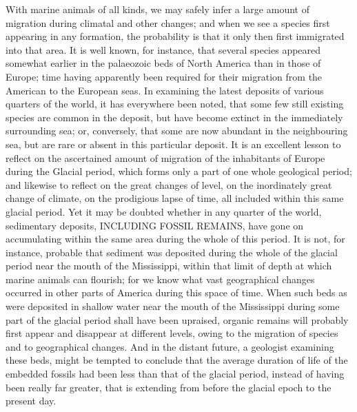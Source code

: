 With marine animals of all kinds, we may safely infer a large amount of migration during climatal and other changes; and when we see a species first appearing in any formation, the probability is that it only then first immigrated into that area. It is well known, for instance, that several species appeared somewhat earlier in the palaeozoic beds of North America than in those of Europe; time having apparently been required for their migration from the American to the European seas. In examining the latest deposits of various quarters of the world, it has everywhere been noted, that some few still existing species are common in the deposit, but have become extinct in the immediately surrounding sea; or, conversely, that some are now abundant in the neighbouring sea, but are rare or absent in this particular deposit. It is an excellent lesson to reflect on the ascertained amount of migration of the inhabitants of Europe during the Glacial period, which forms only a part of one whole geological period; and likewise to reflect on the great changes of level, on the inordinately great change of climate, on the prodigious lapse of time, all included within this same glacial period. Yet it may be doubted whether in any quarter of the world, sedimentary deposits, INCLUDING FOSSIL REMAINS, have gone on accumulating within the same area during the whole of this period. It is not, for instance, probable that sediment was deposited during the whole of the glacial period near the mouth of the Mississippi, within that limit of depth at which marine animals can flourish; for we know what vast geographical changes occurred in other parts of America during this space of time. When such beds as were deposited in shallow water near the mouth of the Mississippi during some part of the glacial period shall have been upraised, organic remains will probably first appear and disappear at different levels, owing to the migration of species and to geographical changes. And in the distant future, a geologist examining these beds, might be tempted to conclude that the average duration of life of the embedded fossils had been less than that of the glacial period, instead of having been really far greater, that is extending from before the glacial epoch to the present day.
